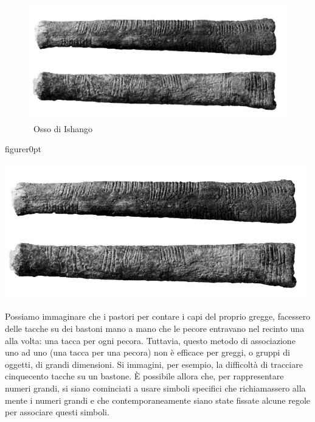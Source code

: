 \ifdefined\HCode                          %
\begin{figure}
\begin{inaccessibleblock}
\includegraphics{img/fig001.png}
\end{inaccessibleblock}
\caption{~Osso di Ishango}
\label{fig:ishango}
\end{figure}
\else                                    %
\begin{wrapfloat}{figure}{r}{0pt}
\begin{inaccessibleblock}
\includegraphics[scale=0.35]{img/fig001.png}
\end{inaccessibleblock}
\caption{Osso di Ishango}
\label{fig:ishango}
\end{wrapfloat}
\fi

Possiamo immaginare che i pastori per contare i capi del proprio gregge, 
facessero delle tacche su dei bastoni mano a mano che le pecore entravano 
nel recinto una alla volta: una tacca per ogni pecora. 
Tuttavia, questo metodo di associazione uno ad uno (una tacca per una 
pecora) non è efficace per greggi, o gruppi di oggetti, di grandi 
dimensioni. 
Si immagini, per esempio, la difficoltà di tracciare cinquecento tacche su 
un bastone. 
È possibile allora che, per rappresentare numeri grandi, si siano cominciati 
a usare simboli specifici che richiamassero alla mente i numeri grandi e 
che contemporaneamente siano state fissate alcune regole per associare 
questi simboli.


